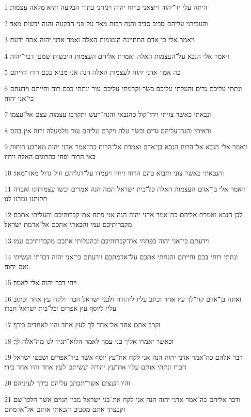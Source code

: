 \par 1 היתה עלי יד־יהוה ויוצאני ברוח יהוה ויניחני בתוך הבקעה והיא מלאה עצמות׃
\par 2 והעבירני עליהם סביב סביב והנה רבות מאד על־פני הבקעה והנה יבשׁות מאד׃
\par 3 ויאמר אלי בן־אדם התחיינה העצמות האלה ואמר אדני יהוה אתה ידעת׃
\par 4 ויאמר אלי הנבא על־העצמות האלה ואמרת אליהם העצמות היבשׁות שׁמעו דבר־יהוה׃
\par 5 כה אמר אדני יהוה לעצמות האלה הנה אני מביא בכם רוח וחייתם׃
\par 6 ונתתי עליכם גדים והעלתי עליכם בשׂר וקרמתי עליכם עור ונתתי בכם רוח וחייתם וידעתם כי־אני יהוה׃
\par 7 ונבאתי כאשׁר צויתי ויהי־קול כהנבאי והנה־רעשׁ ותקרבו עצמות עצם אל־עצמו׃
\par 8 וראיתי והנה־עליהם גדים ובשׂר עלה ויקרם עליהם עור מלמעלה ורוח אין בהם׃
\par 9 ויאמר אלי הנבא אל־הרוח הנבא בן־אדם ואמרת אל־הרוח כה־אמר אדני יהוה מארבע רוחות באי הרוח ופחי בהרוגים האלה ויחיו׃
\par 10 והנבאתי כאשׁר צוני ותבוא בהם הרוח ויחיו ויעמדו על־רגליהם חיל גדול מאד־מאד׃
\par 11 ויאמר אלי בן־אדם העצמות האלה כל־בית ישׂראל המה הנה אמרים יבשׁו עצמותינו ואבדה תקותנו נגזרנו לנו׃
\par 12 לכן הנבא ואמרת אליהם כה־אמר אדני יהוה הנה אני פתח את־קברותיכם והעליתי אתכם מקברותיכם עמי והבאתי אתכם אל־אדמת ישׂראל׃
\par 13 וידעתם כי־אני יהוה בפתחי את־קברותיכם ובהעלותי אתכם מקברותיכם עמי׃
\par 14 ונתתי רוחי בכם וחייתם והנחתי אתכם על־אדמתכם וידעתם כי־אני יהוה דברתי ועשׂיתי נאם־יהוה׃
\par 15 ויהי דבר־יהוה אלי לאמר׃
\par 16 ואתה בן־אדם קח־לך עץ אחד וכתב עליו ליהודה ולבני ישׂראל חברו ולקח עץ אחד וכתוב עליו ליוסף עץ אפרים וכל־בית ישׂראל חברו׃
\par 17 וקרב אתם אחד אל־אחד לך לעץ אחד והיו לאחדים בידך׃
\par 18 וכאשׁר יאמרו אליך בני עמך לאמר הלוא־תגיד לנו מה־אלה לך׃
\par 19 דבר אלהם כה־אמר אדני יהוה הנה אני לקח את־עץ יוסף אשׁר ביד־אפרים ושׁבטי ישׂראל חברו ונתתי אותם עליו את־עץ יהודה ועשׂיתם לעץ אחד והיו אחד בידי׃
\par 20 והיו העצים אשׁר־תכתב עליהם בידך לעיניהם׃
\par 21 ודבר אליהם כה־אמר אדני יהוה הנה אני לקח את־בני ישׂראל מבין הגוים אשׁר הלכו־שׁם וקבצתי אתם מסביב והבאתי אותם אל־אדמתם׃
